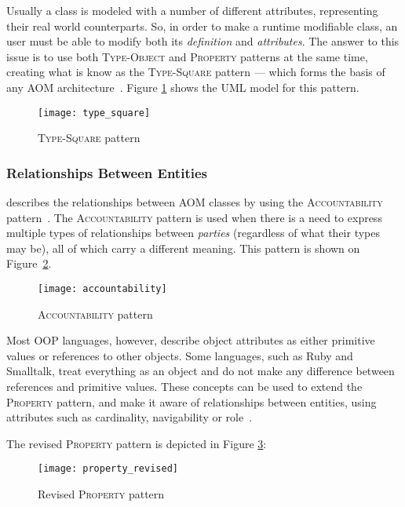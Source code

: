 Usually a class is modeled with a number of different attributes, representing their real world counterparts. So, in order to make a runtime modifiable class, an user must be able to modify both its \emph{definition} and \emph{attributes}. The answer to this issue is to use both \textsc{Type-Object} and \textsc{Property} patterns at the same time, creating what is know as the \textsc{Type-Square} pattern --- which forms the basis of any AOM architecture~\cite{YJ02}. Figure \ref{fig:type_square} shows the UML model for this pattern.

\begin{figure}[H]
  \centering
  \texttt{[image: type\_square]}
  \caption{\textsc{Type-Square} pattern}
  \label{fig:type_square}
\end{figure}

\subsubsection{Relationships Between Entities}\label{sec:relationships_between_entities}

\cite{YJ02} describes the relationships between AOM classes by using the \textsc{Accountability} pattern~\cite{fowler, hay}. The \textsc{Accountability} pattern is used when there is a need to express multiple types of relationships between \emph{parties} (regardless of what their types may be), all of which carry a different meaning\cite{fowler_accountability}. This pattern is shown on Figure~\ref{fig:accountability}.

\begin{figure}[H]
  \centering
  \texttt{[image: accountability]}
  \caption{\textsc{Accountability} pattern}
  \label{fig:accountability}
\end{figure}

Most OOP languages, however, describe object attributes as either primitive values or references to other objects. Some languages, such as Ruby and Smalltalk, treat everything as an object and do not make any difference between references and primitive values. These concepts can be used to extend the \textsc{Property} pattern, and make it aware of relationships between entities, using attributes such as cardinality, navigability or role~\cite{aom_research_roadmap}.

The revised \textsc{Property} pattern is depicted in Figure \ref{fig:property_revised}:

\begin{figure}[H]
  \centering
  \texttt{[image: property\_revised]}
  \caption{Revised \textsc{Property} pattern}
  \label{fig:property_revised}
\end{figure}

